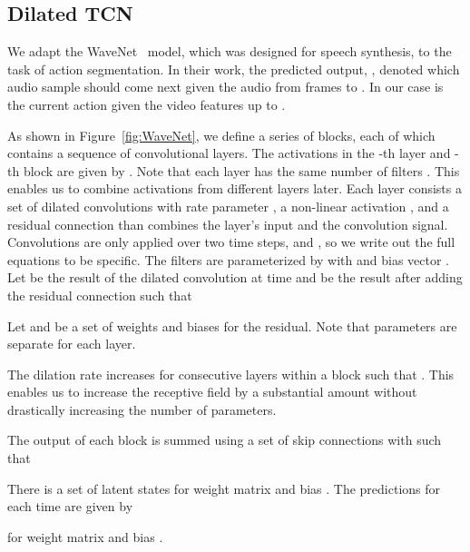 \documentclass[10pt,twocolumn,letterpaper]{article}
\begin{document}
\subsection{Dilated TCN}

We adapt the WaveNet~\cite{wavenet} model, which was designed for speech synthesis,  to the task of action segmentation. In their work, the predicted output, , denoted which audio sample should come next given the audio from frames  to .
In our case  is the current action given the video features up to .


As shown in Figure~\ref{fig:WaveNet}, we define a series of blocks, each of which contains a sequence of  convolutional layers. The activations in the -th layer and -th block are given by .
Note that each layer has the same number of filters .
This enables us to combine  activations from different layers later. 
Each layer consists a set of dilated convolutions with rate parameter , a non-linear activation , and a residual connection than combines the layer's input and the convolution signal. 
Convolutions are only applied over two time steps,  and , so we write out the full equations to be specific.
The filters are parameterized by  with  and bias vector . 
Let  be the result of the dilated convolution at time  and  be the result after adding the residual connection such that

Let  and  be a set of weights and biases for the residual. Note that parameters  are separate for each layer.


The dilation rate increases for consecutive layers within a block such that .
This enables us to increase the receptive field by a substantial amount without drastically increasing the number of parameters. 










The output of each block is summed using a set of skip connections with  such that 

There is a set of latent states  for weight matrix  and bias . 
The predictions for each time  are given by

for weight matrix  and bias .
\end{document}
